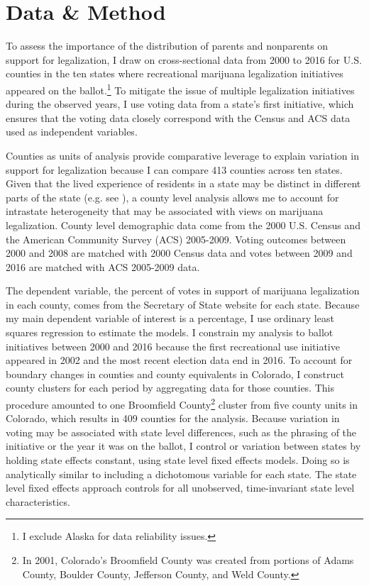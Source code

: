 \section{Data \& Method}

To assess the importance of the distribution of parents and nonparents on support for legalization, I draw on cross-sectional data from 2000 to 2016 for U.S. counties in the ten states where recreational marijuana legalization initiatives appeared on the ballot.\footnote{I exclude Alaska for data reliability issues.} To mitigate the issue of multiple legalization initiatives during the observed years, I use voting data from a state's first initiative, which ensures that the voting data closely correspond with the Census and ACS data used as independent variables. 




Counties as units of analysis provide comparative leverage to explain variation in support for legalization because I can compare 413 counties across ten states. Given that the lived experience of residents in a state may be distinct in different parts of the state (e.g. see \citealt{mcveigh_and_sobolewski_2007}), a county level analysis allows me to account for intrastate heterogeneity that may be associated with views on marijuana legalization. County level demographic data come from the 2000 U.S. Census and the American Community Survey (ACS) 2005-2009. Voting outcomes between 2000 and 2008 are matched with 2000 Census data and votes between 2009 and 2016 are matched with ACS 2005-2009 data. 

The dependent variable, the percent of votes in support of marijuana legalization in each county, comes from the Secretary of State website for each state. Because my main dependent variable of interest is a percentage, I use ordinary least squares regression to estimate the models. I constrain my analysis to ballot initiatives between 2000 and 2016 because the first recreational use initiative appeared in 2002 and the most recent election data end in 2016. To account for boundary changes in counties and county equivalents in Colorado, I construct county clusters for each period by aggregating data for those counties. This procedure amounted to one Broomfield County\footnote{In 2001, Colorado's Broomfield County was created from portions of Adams County, Boulder County, Jefferson County, and Weld County.} cluster from five county units in Colorado, which results in 409 counties for the analysis. Because variation in voting may be associated with state level differences, such as the phrasing of the initiative or the year it was on the ballot, I control or variation between states by holding state effects constant, using state level fixed effects models. Doing so is analytically similar to including a dichotomous variable for each state. The state level fixed effects approach controls for all unobserved, time-invariant state level characteristics.

